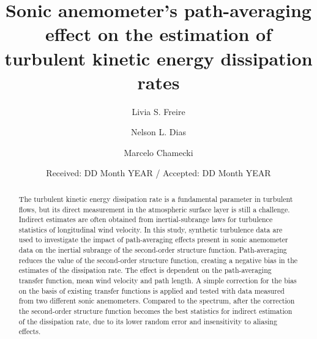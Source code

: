 \documentclass{svjour3}                     %
\begin{document}
\title{Sonic anemometer's path-averaging effect on the estimation of
  turbulent kinetic energy dissipation rates}


\author{Livia S. Freire \and  Nelson L. Dias \and Marcelo Chamecki}



\date{Received: DD Month YEAR / Accepted: DD Month YEAR}


\maketitle

\begin{abstract}

  The turbulent kinetic energy dissipation rate is a fundamental
  parameter in turbulent flows, but its direct measurement in the
  atmospheric surface layer is still a challenge. Indirect estimates
  are often obtained from inertial-subrange laws for turbulence
  statistics of longitudinal wind velocity. In this study, synthetic
  turbulence data are used to investigate the impact of path-averaging
  effects present in sonic anemometer data on the inertial subrange of
  the second-order structure function. Path-averaging reduces the
  value of the second-order structure function, creating a negative
  bias in the estimates of the dissipation rate. The effect is
  dependent on the path-averaging transfer function, mean wind
  velocity and path length. A simple correction for the bias on the
  basis of existing transfer functions is applied and tested with data
  measured from two different sonic anemometers. Compared to the
  spectrum, after the correction the second-order structure function
  becomes the best statistics for indirect estimation of the
  dissipation rate, due to its lower random error and insensitivity to
  aliasing effects.

\end{abstract}
\end{document}
